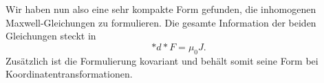 Wir haben nun also eine sehr kompakte Form gefunden, die inhomogenen Maxwell-Gleichungen zu formulieren.
Die gesamte Information der beiden Gleichungen steckt in
\begin{equation}
	\ast d {\ast} F = \mu_0 J.
\end{equation}
Zusätzlich ist die Formulierung kovariant und behält somit seine Form bei Koordinatentransformationen.
\begin{comment}
Damit wir nun den erhaltenen Ausdruck auch interpretieren können definieren wir die Viererstromdichte als
\begin{equation}
	J = -c\rho dx^0 + J_1 dx^1 + J_2 dx^2 +J_3 dx^3.
\end{equation}
Schreiben wir auch diese 1-Form in physikalisch sinnvollen Einheiten erhalten wir 
\begin{equation}
	J = -c^2\rho dt + J_1 dx + J_2 dy + J_3 dz.
\end{equation}
Multiplizieren wir zu $J$ noch ein $\mu_0$ erhalten wir den Ausdruck
\begin{equation}
	\mu_0 J = -\frac{\rho}{\varepsilon_0}dt + \mu_0 (J_1 dx +  J_2 dy +  J_3 dz),
\end{equation}
weil im Vakuum $c = \frac{1}{\sqrt{\varepsilon_0 \mu_0}}$ gilt. Setzen wir nun die beiden Teile der Gleichung zusammen ergibt sich
\begin{equation}
	\ast d \ast F = \mu_0 J.
\end{equation}
Jetzt können wir die einzelnen Teile vergleichen und wissen bereits, dass es sich um vier unabhängige Gleichungen handeln muss, nämlich eine für jede Basis-1-Form.

Betrachten wir nur die Koeffizienten der Zeitkomponente $dt$, resultiert die Gleichung
\begin{equation}
	\frac{\partial E_1}{\partial x} +\frac{\partial E_2}{\partial y} + \frac{\partial E_3}{\partial z} = \frac{\rho}{\varepsilon_0},
\end{equation}
(Frage: hier die $dt$ auf beiden Seiten der Gleichung explizit hinschreiben damit klar ist, dass es sich um eine 1-Form handelt oder ist das egal?)

welche als das Gausssche Gesetz der Elektrostatik bekannt ist.
diese Gleichung lässt sich, sofern man eine kartesische Raumstruktur wählt, in die klassische Vektorform
\begin{equation}
	\nabla \cdot \vec{E} = \frac{\rho}{\varepsilon_0}
\end{equation}
umschreiben.


\end{comment}
